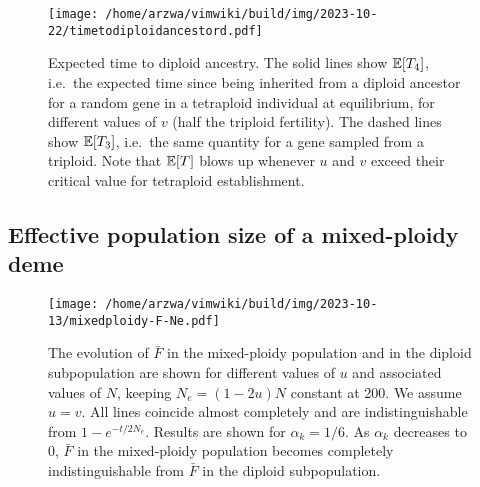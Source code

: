 \documentclass[11pt,a4paper]{article}
\begin{document}
\begin{figure}
\centering
\texttt{[image: /home/arzwa/vimwiki/build/img/2023-10-22/timetodiploidancestord.pdf]}
\caption{Expected time to diploid ancestry. The solid lines show
\(\mathbb{E}[T_4]\), i.e.~the expected time since being inherited from a
diploid ancestor for a random gene in a tetraploid individual at
equilibrium, for different values of \(v\) (half the triploid
fertility). The dashed lines show \(\mathbb{E}[T_3]\), i.e.~the same quantity
for a gene sampled from a triploid. Note that \(\mathbb{E}[T]\) blows up
whenever \(u\) and \(v\) exceed their critical value for tetraploid
establishment. \label{fig:ttdip}}
\end{figure}

\subsection{Effective population size of a mixed-ploidy deme \label{sec:effsize}}

\begin{figure}
\centering
\texttt{[image: /home/arzwa/vimwiki/build/img/2023-10-13/mixedploidy-F-Ne.pdf]}
\caption{The evolution of \(\bar{F}\) in the mixed-ploidy population and
in the diploid subpopulation are shown for different values of \(u\) and
associated values of \(N\), keeping \(N_e = (1-2u)N\) constant at 200.
We assume \(u=v\). All lines coincide almost completely and are
indistinguishable from \(1-e^{-t/2N_e}\). Results are shown for
\(\alpha_k=1/6\). As \(\alpha_k\) decreases to 0, \(\bar{F}\) in the
mixed-ploidy population becomes completely indistinguishable from
\(\bar{F}\) in the diploid subpopulation.}\label{fig:fNe}
\end{figure}
\end{document}
